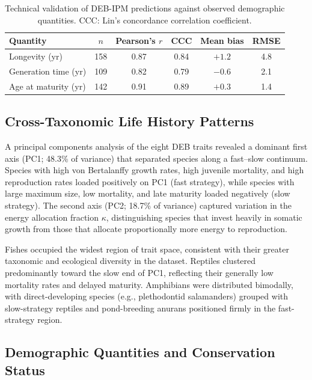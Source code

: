 \documentclass[11pt]{article}
\begin{document}
\begin{table}[t]
\centering
\caption{Technical validation of DEB-IPM predictions against observed demographic quantities. CCC: Lin's concordance correlation coefficient.}
\label{tab:validation}
\begin{tabular}{@{}lccccc@{}}
\toprule
Quantity & $n$ & Pearson's $r$ & CCC & Mean bias & RMSE \\
\midrule
Longevity (yr)       & 158 & 0.87 & 0.84 & $+1.2$  & 4.8  \\
Generation time (yr) & 109 & 0.82 & 0.79 & $-0.6$  & 2.1  \\
Age at maturity (yr) & 142 & 0.91 & 0.89 & $+0.3$  & 1.4  \\
\bottomrule
\end{tabular}
\end{table}

\subsection{Cross-Taxonomic Life History Patterns}

A principal components analysis of the eight DEB traits revealed a dominant first axis (PC1; 48.3\% of variance) that separated species along a fast--slow continuum. Species with high von Bertalanffy growth rates, high juvenile mortality, and high reproduction rates loaded positively on PC1 (fast strategy), while species with large maximum size, low mortality, and late maturity loaded negatively (slow strategy). The second axis (PC2; 18.7\% of variance) captured variation in the energy allocation fraction $\kappa$, distinguishing species that invest heavily in somatic growth from those that allocate proportionally more energy to reproduction.

Fishes occupied the widest region of trait space, consistent with their greater taxonomic and ecological diversity in the dataset. Reptiles clustered predominantly toward the slow end of PC1, reflecting their generally low mortality rates and delayed maturity. Amphibians were distributed bimodally, with direct-developing species (e.g., plethodontid salamanders) grouped with slow-strategy reptiles and pond-breeding anurans positioned firmly in the fast-strategy region.

\subsection{Demographic Quantities and Conservation Status}
\end{document}
